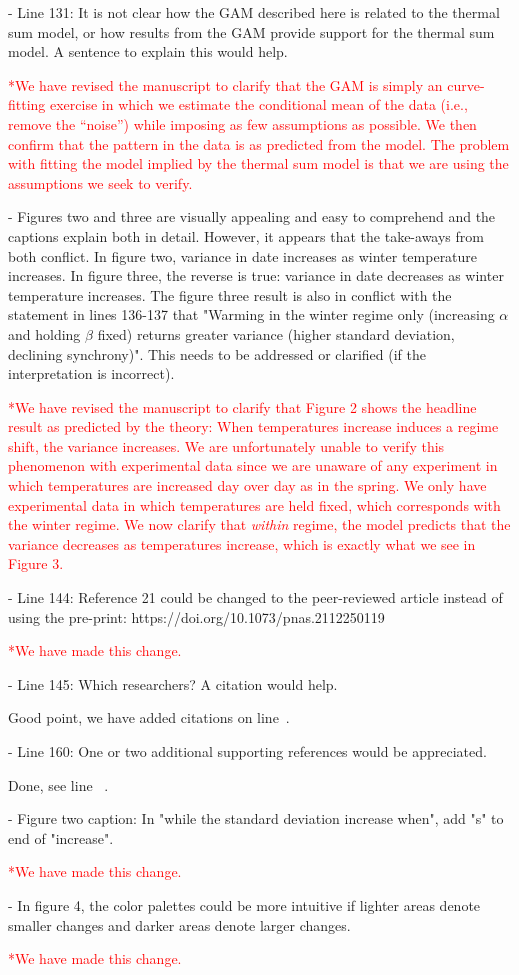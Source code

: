 \documentclass{article}
\newcommand{\lr}[1]{line~\lineref{#1}}
\begin{document}
- Line 131: It is not clear how the GAM described here is related to the thermal sum model, or how results from the GAM provide support for the thermal sum model. A sentence to explain this would help.

\textcolor{red}{*We have revised the manuscript to clarify that the GAM is simply an curve-fitting exercise in which we estimate the conditional mean of the data (i.e., remove the ``noise'') while imposing as few assumptions as possible. We then confirm that the pattern in the data is as predicted from the model. The problem with fitting the model implied by the thermal sum model is that we are using the assumptions we seek to verify.}

- Figures two and three are visually appealing and easy to comprehend and the captions explain both in detail. However, it appears that the take-aways from both conflict. In figure two, variance in date increases as winter temperature increases. In figure three, the reverse is true: variance in date decreases as winter temperature increases. The figure three result is also in conflict with the statement in lines 136-137 that "Warming in the winter regime only (increasing $\alpha$ and holding $\beta$ fixed) returns greater variance (higher standard deviation, declining synchrony)". This needs to be addressed or clarified (if the interpretation is incorrect).

\textcolor{red}{*We have revised the manuscript to clarify that Figure 2 shows the headline result as predicted by the theory: When temperatures increase induces a regime shift, the variance increases. We are unfortunately unable to verify this phenomenon with experimental data since we are unaware of any experiment in which temperatures are increased day over day as in the spring. We only have experimental data in which temperatures are held fixed, which corresponds with the winter regime. We now clarify that \emph{within} regime, the model predicts that the variance decreases as temperatures increase, which is exactly what we see in Figure 3.}

- Line 144: Reference 21 could be changed to the peer-reviewed article instead of using the pre-print: https://doi.org/10.1073/pnas.2112250119

\textcolor{red}{*We have made this change.}

- Line 145: Which researchers? A citation would help.

Good point, we have added citations on \lr{addedcites1}.

- Line 160: One or two additional supporting references would be appreciated.

Done, see \lr{morecites2} .

- Figure two caption: In "while the standard deviation increase when", add "s" to end of "increase".

\textcolor{red}{*We have made this change.}

- In figure 4, the color palettes could be more intuitive if lighter areas denote smaller changes and darker areas denote larger changes. %

\textcolor{red}{*We have made this change.}

\newpage 


\end{document}
